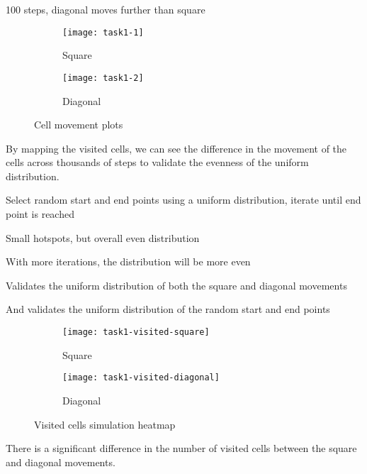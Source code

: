 100 steps, diagonal moves further than square

\begin{figure}[ht]
    \centering
    \begin{subfigure}{0.45\textwidth}
    	\texttt{[image: task1-1]}
    	\caption[Square]{Square}
    	\label{fig:task1-1}
    \end{subfigure}
    \begin{subfigure}{0.45\textwidth}
    	\texttt{[image: task1-2]}
    	\caption[Diagonal]{Diagonal}
    	\label{fig:task1-2}
	\end{subfigure}
	\caption[Cell movement plots]{Cell movement plots}
    \label{fig:task1}
\end{figure}

\clearpage

By mapping the visited cells, we can see the difference in the movement of the cells across thousands of steps to validate the evenness of the uniform distribution.

Select random start and end points using a uniform distribution, iterate until end point is reached

Small hotspots, but overall even distribution

With more iterations, the distribution will be more even

Validates the uniform distribution of both the square and diagonal movements

And validates the uniform distribution of the random start and end points

\begin{figure}[ht]
    \centering
    \begin{subfigure}{0.45\textwidth}
        \texttt{[image: task1-visited-square]}
        \caption[Square]{Square}
        \label{fig:task1-visited-square}
    \end{subfigure}
    \begin{subfigure}{0.45\textwidth}
        \texttt{[image: task1-visited-diagonal]}
        \caption[Diagonal]{Diagonal}
        \label{fig:task1-visited-diagonal}
    \end{subfigure}
    \caption[Visited cells simulation heatmap]{Visited cells simulation heatmap}
    \label{fig:task1-visited}
\end{figure}

There is a significant difference in the number of visited cells between the square and diagonal movements.

